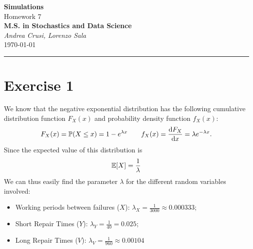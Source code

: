 \documentclass[12pt]{article}
\begin{document}
	\textcolor{UM_Brown}{
		\begin{center}
			\textbf{\Large Simulations}\\
			\vspace{5pt}
			Homework 7 \\
			\vspace{5pt}
			\textbf{M.S. in Stochastics and Data Science}\\
			\vspace{20pt}
			\textit{Andrea Crusi, Lorenzo Sala} \\
			\vspace{5pt}
			\today
		\end{center}
		\vspace{10pt}
		\hrule
	}
	
	
	
	\section{Exercise 1}
	We know that the negative exponential distribution has the following cumulative distribution function $F_X(x)$ and probability density function $f_X(x)$:
	\begin{equation*}
		F_X(x)=\mathbb{P}(X\leq x)=1-e^{\lambda x}\qquad f_X(x)=\frac{\mathop{}\!\mathrm{d} F_X}{\mathop{}\!\mathrm{d} x}=\lambda e^{-\lambda x}.
	\end{equation*}
	Since the expected value of this distribution is
	\begin{equation*}
		\mathbb{E}[X]=\frac{1}{\lambda}
	\end{equation*}
	We can thus easily find the parameter $\lambda$ for the different random variables involved:
	\begin{itemize}
		\item Working periods between failures ($X$): $\lambda_X=\frac{1}{3000}\approx0.000333$;
		\item Short Repair Times ($Y$): $\lambda_Y=\frac{1}{40}=0.025$;
		\item Long Repair Times ($V$): $\lambda_V=\frac{1}{960}\approx 0.00104$
	\end{itemize}
\end{document}
